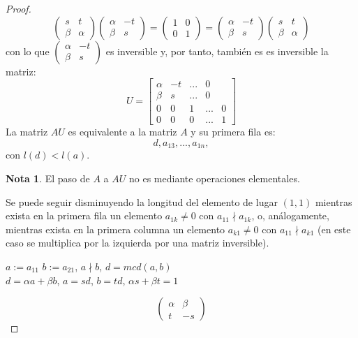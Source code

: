 \documentclass{article}
\theoremstyle{theorem-style}  %
\theoremstyle{definition}
\newtheorem*{note}{Nota} %
\theoremstyle{example-style}
\begin{document}
\begin{proof}
\[\begin{pmatrix}
		s & t \\
		\beta & \alpha
		\end{pmatrix}
		\begin{pmatrix}
		 \alpha & -t \\
		\beta & s
		\end{pmatrix} =
		\begin{pmatrix}
		1 & 0\\
		0 & 1
		\end{pmatrix} =
		\begin{pmatrix}
		\alpha & -t \\
		\beta & s
		\end{pmatrix}
		\begin{pmatrix}
		s & t \\
		\beta & \alpha
		\end{pmatrix}
		\]
		con lo que $\begin{pmatrix}
		\alpha & -t \\
		\beta & s
		\end{pmatrix} $ es inversible y, por tanto, también es es inversible la matriz:
		\[U = \begin{bmatrix}
		\alpha & -t & ... & 0 \\
		\beta & s & ... & 0\\
		0  & 0 & 1 & ... & 0 \\
		0 & 0 & 0 & ... & 1
		\end{bmatrix}\]
		La matriz $AU$ es equivalente a la matriz $A$ y su primera fila es:
		\[d, a_{13}, ..., a_ {1n},\]
		con $l(d) < l(a)$.
		\begin{note}
			El paso de $A$ a $AU$ no es mediante operaciones elementales.
		\end{note}
		Se puede seguir disminuyendo la longitud del elemento de lugar $(1, 1)$ mientras exista en la primera fila un elemento $a_{1k} \neq 0$ con $a_{11} \nmid a_{1k}$, o, análogamente, mientras exista en la primera columna un elemento $a_{k1} \neq 0$ con $a_{11} \nmid a_{k1}$ (en este caso se multiplica por la izquierda por una matriz inversible).
		\begin{center}
			$a:= a_{11} $ $b:= a_{21}$, $a \nmid b$, $d = mcd(a, b)$ \\
			$d = \alpha a + \beta b$, $a = sd$, $b = td$, $\alpha s + \beta t = 1$ \\
		\end{center}
		\[\begin{pmatrix}
		\alpha & \beta \\
		 t & -s
		\end{pmatrix}
\]
\end{proof}
\end{document}
